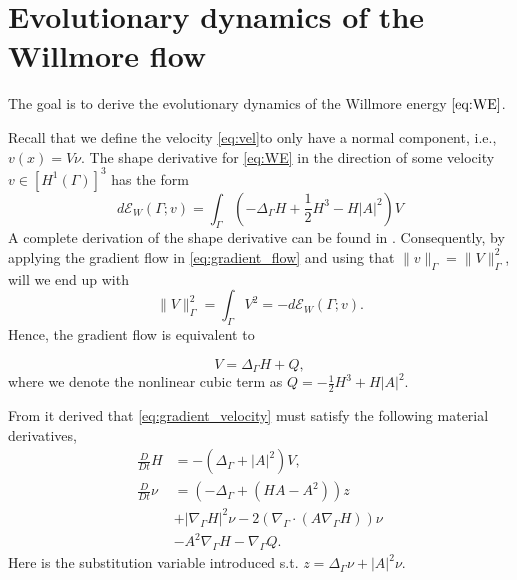 

\section{Evolutionary dynamics of the Willmore flow}%
\label{sec:evolutionary_pde_s_of_the_willmore_flow}

The goal is to derive the evolutionary dynamics of the Willmore energy $\eqref{eq:WE} $.

Recall that we define the velocity \eqref{eq:vel}to only have a normal component, i.e., $v\left( x \right)  = V \nu $.
The shape derivative for \eqref{eq:WE} in the direction of some velocity $v \in \left[ H^{1}\left( \Gamma  \right)  \right]^3   $ has the form \[
d\mathcal{E}_{W} \left( \Gamma; v  \right)  = \int_{\Gamma }^{} \left( - \Delta _{\Gamma } H + \frac{1}{2} H^{3} - H \left\lvert A \right\rvert^2  \right) V
\]
A complete derivation of the shape derivative can be found in \cite[Corally 4.7]{dougan2012first}. Consequently, by applying the gradient flow in \eqref{eq:gradient_flow} and using that $\| v \|_{ \Gamma  }^{  }  = \| V \|_{ \Gamma   }^{2  }   $, will we end up with
\[
      \| V \|_{ \Gamma   }^{2  } = \int_{\Gamma }^{} V^2 = -d \mathcal{E}_{W} \left( \Gamma ;v \right).
\]
Hence, the gradient flow is equivalent to

\begin{equation}
\label{eq:gradient_velocity}
V  =   \Delta _{\Gamma } H + Q,
\end{equation}
\[
\]
where we denote the nonlinear cubic term as $Q  = - \frac{1}{2} H^{3} + H \left\lvert A \right\rvert^2$.

From \cite[Lemma 2.1]{kovacs2021convergent} it derived that \eqref{eq:gradient_velocity} must satisfy the following material derivatives,
\[
    \begin{split}
\frac{D}{Dt}H & = - \left( \Delta _{\Gamma } + \left\lvert A \right\rvert ^2   \right) V, \\
\frac{D}{Dt} \nu & = \left( -\Delta _{\Gamma } + \left( HA - A^2 \right)  \right) z  \\
&  + \left\lvert \nabla _{\Gamma } H \right\rvert ^2   \nu - 2\left( \nabla _{\Gamma }\cdot \left( A \nabla _{\Gamma } H \right)  \right) \nu  \\
  & -A^2 \nabla _{\Gamma } H  - \nabla _{\Gamma } Q.
    \end{split}
\]
Here is the substitution variable introduced s.t. $z = \Delta  _{\Gamma } \nu  + \left\lvert A \right\rvert ^2 \nu $.


